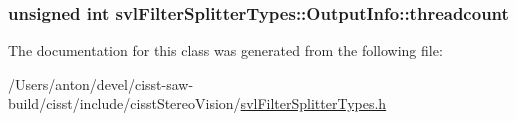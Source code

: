 \subsubsection[{threadcount}]{\setlength{\rightskip}{0pt plus 5cm}unsigned int svl\+Filter\+Splitter\+Types\+::\+Output\+Info\+::threadcount}\label{classsvl_filter_splitter_types_1_1_output_info_a1829a482e318313cde1c6ef063912ada}


The documentation for this class was generated from the following file\+:\begin{DoxyCompactItemize}
\item 
/\+Users/anton/devel/cisst-\/saw-\/build/cisst/include/cisst\+Stereo\+Vision/\hyperlink{svl_filter_splitter_types_8h}{svl\+Filter\+Splitter\+Types.\+h}\end{DoxyCompactItemize}
